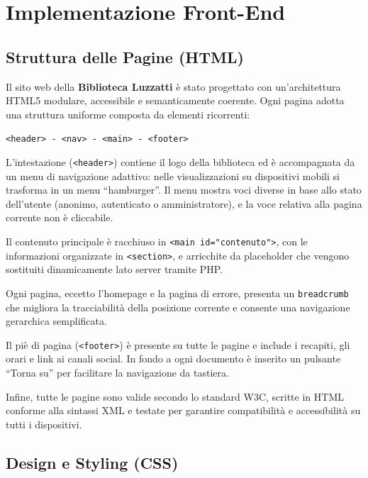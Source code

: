 \documentclass{article}
\begin{document}
\newpage

\section{Implementazione Front-End}

\subsection{Struttura delle Pagine (HTML)}

Il sito web della \textbf{Biblioteca Luzzatti} è stato progettato con un'architettura HTML5 modulare, accessibile e semanticamente coerente. Ogni pagina adotta una struttura uniforme composta da elementi ricorrenti:

\begin{center}
\texttt{<header> - <nav> - <main> - <footer>}
\end{center}

L'intestazione (\texttt{<header>}) contiene il logo della biblioteca ed è accompagnata da un menu di navigazione adattivo: nelle visualizzazioni su dispositivi mobili si trasforma in un menu “hamburger”. Il menu mostra voci diverse in base allo stato dell’utente (anonimo, autenticato o amministratore), e la voce relativa alla pagina corrente non è cliccabile.

Il contenuto principale è racchiuso in \texttt{<main id="contenuto">}, con le informazioni organizzate in \texttt{<section>}, e arricchite da placeholder che vengono sostituiti dinamicamente lato server tramite PHP.

Ogni pagina, eccetto l’homepage e la pagina di errore, presenta un \texttt{breadcrumb} che migliora la tracciabilità della posizione corrente e consente una navigazione gerarchica semplificata.

Il piè di pagina (\texttt{<footer>}) è presente su tutte le pagine e include i recapiti, gli orari e link ai canali social. In fondo a ogni documento è inserito un pulsante “Torna su” per facilitare la navigazione da tastiera.

Infine, tutte le pagine sono valide secondo lo standard W3C, scritte in HTML conforme alla sintassi XML e testate per garantire compatibilità e accessibilità su tutti i dispositivi.


\vspace{1em}

\subsection{Design e Styling (CSS)}
\end{document}

